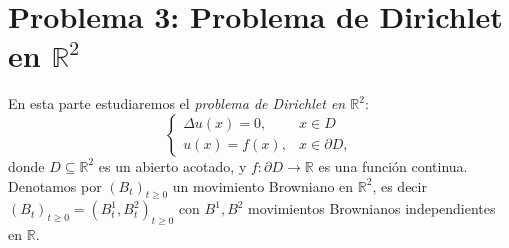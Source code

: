\section*{Problema 3: Problema de Dirichlet en $\mathbb{R}^2$}
En esta parte estudiaremos el \emph{problema de Dirichlet en $\mathbb{R}^2$}:
\begin{equation}
\label{eq:Dirichlet}
\begin{cases}
\Delta u(x) = 0, & x \in D \\
u(x) = f(x), & x \in \partial D,
\end{cases}
\end{equation}
donde $D\subseteq \mathbb{R}^2$ es un abierto acotado, y $f:\partial D \to \mathbb{R}$ es una función continua. 
Denotamos por $(B_t)_{t\geq 0}$  un movimiento Browniano en $\mathbb{R}^2$, es decir  $(B_t)_{t\geq 0}= (B^1_t, B^2_t)_{t\geq 0}$ con $B^1, B^2$ movimientos Brownianos independientes en $\mathbb{R}$. 

